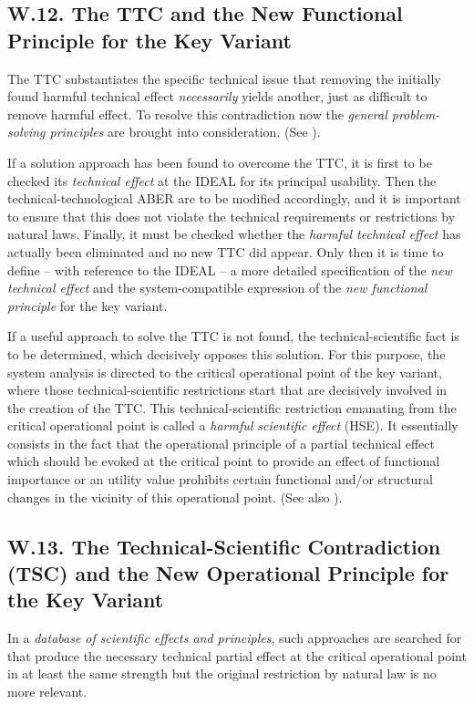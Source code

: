 \documentclass[11pt,a4paper]{article}
\begin{document}
\subsection*{W.12. The TTC and the New Functional Principle for the Key
  Variant} 

The TTC substantiates the specific technical issue that removing the initially
found harmful technical effect \emph{necessarily} yields another, just as
difficult to remove harmful effect. To resolve this contradiction now the
\emph{general problem-solving principles} are brought into consideration. (See
\cite[A.9]{RM-21}).

If a solution approach has been found to overcome the TTC, it is first to be
checked its \emph{technical effect} at the IDEAL for its principal usability.
Then the technical-technological ABER are to be modified accordingly, and it
is important to ensure that this does not violate the technical requirements
or restrictions by natural laws.  Finally, it must be checked whether the
\emph{harmful technical effect} has actually been eliminated and no new TTC
did appear.  Only then it is time to define -- with reference to the IDEAL --
a more detailed specification of the \emph{new technical effect} and the
system-compatible expression of the \emph{new functional principle} for the
key variant.

If a useful approach to solve the TTC is not found, the technical-scientific
fact is to be determined, which decisively opposes this solution.  For this
purpose, the system analysis is directed to the critical operational point of
the key variant, where those technical-scientific restrictions start that are
decisively involved in the creation of the TTC. This technical-scientific
restriction emanating from the critical operational point is called a
\emph{harmful scientific effect} (HSE). It essentially consists in the fact
that the operational principle of a partial technical effect which should be
evoked at the critical point to provide an effect of functional importance or
an utility value prohibits certain functional and/or structural changes in the
vicinity of this operational point. (See also \cite[A.7]{RM-21}).

\subsection*{W.13. The Technical-Scientific Contradiction (TSC) and the New
  Operational Principle for the Key Variant}

In a \emph{database of scientific effects and principles}, such approaches are
searched for that produce the necessary technical partial effect at the
critical operational point in at least the same strength but the original
restriction by natural law is no more relevant.
\end{document}
